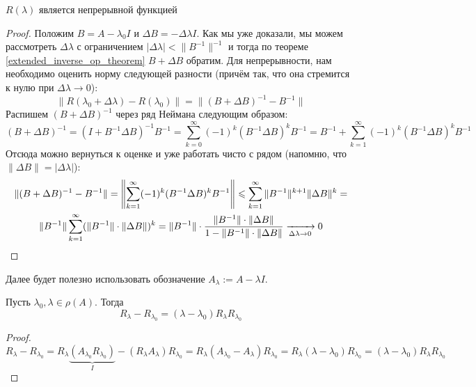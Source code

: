 \begin{proposition}
	$R(\lambda)$ является непрерывной функцией
\end{proposition}

\begin{proof}
	Положим $B = A - \lambda_0 I$ и $\Delta B = -\Delta \lambda I$. Как мы уже доказали, мы можем рассмотреть $\Delta \lambda$ с ограничением $|\Delta \lambda| < \|B^{-1}\|^{-1}$ и тогда по теореме \ref{extended_inverse_op_theorem} $B + \Delta B$ обратим. Для непрерывности, нам необходимо оценить норму следующей разности (причём так, что она стремится к нулю при $\Delta \lambda \to 0$):
	\[
		\|R(\lambda_0 + \Delta \lambda) - R(\lambda_0)\| = \|(B + \Delta B)^{-1} - B^{-1}\|
	\]
	Распишем $(B + \Delta B)^{-1}$ через ряд Неймана следующим образом:
	\[
		(B + \Delta B)^{-1} = (I + B^{-1}\Delta B)^{-1}B^{-1} = \sum_{k = 0}^\infty (-1)^k (B^{-1}\Delta B)^k B^{-1} = B^{-1} + \sum_{k = 1}^\infty (-1)^k (B^{-1}\Delta B)^kB^{-1}
	\]
	Отсюда можно вернуться к оценке и уже работать чисто с рядом (напомню, что $\|\Delta B\| = |\Delta \lambda|$):
	\begin{multline*}
		\|(B + \Delta B)^{-1} - B^{-1}\| = \left\|\sum_{k = 1}^\infty (-1)^k(B^{-1}\Delta B)^kB^{-1}\right\| \leqslant \sum_{k = 1}^\infty \|B^{-1}\|^{k + 1}\|\Delta B\|^k =
		\\
		\|B^{-1}\|\sum_{k = 1}^\infty (\|B^{-1}\| \cdot \|\Delta B\|)^k = \|B^{-1}\| \cdot \frac{\|B^{-1}\| \cdot \|\Delta B\|}{1 - \|B^{-1}\| \cdot \|\Delta B\|} \xrightarrow[\Delta \lambda \to 0]{} 0
	\end{multline*}
\end{proof}

\begin{note}
	Далее будет полезно использовать обозначение $A_\lambda := A - \lambda I$.
\end{note}

\begin{proposition}
	Пусть $\lambda_0, \lambda \in \rho(A)$. Тогда
	\[
		R_\lambda - R_{\lambda_0} = (\lambda - \lambda_0)R_\lambda R_{\lambda_0}
	\]
\end{proposition}

\begin{proof}
	\[
		R_\lambda - R_{\lambda_0} = R_\lambda \underbrace{(A_{\lambda_0} R_{\lambda_0})}_{I} - (R_\lambda A_\lambda) R_{\lambda_0} = R_\lambda (A_{\lambda_0} - A_\lambda)R_{\lambda_0} = R_\lambda (\lambda - \lambda_0)R_{\lambda_0} = (\lambda - \lambda_0)R_\lambda R_{\lambda_0}
	\]
\end{proof}

